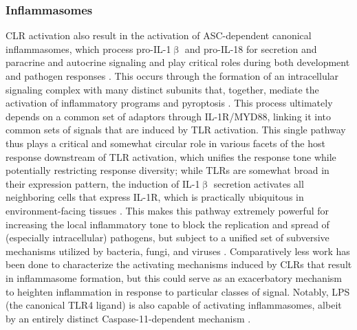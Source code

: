 \subsubsection{Inflammasomes}\label{clr:asc}

CLR activation also result in the activation of ASC\hyp{}dependent canonical inflammasomes, which process pro\hyp{}IL\hyp{}1$\upbeta$ and pro\hyp{}IL\hyp{}18 for secretion and paracrine and autocrine signaling \citep{Gross2011} and play critical roles during both development and pathogen responses \citep{Tyrkalska2019}. This occurs through the formation of an intracellular signaling complex with many distinct subunits that, together, mediate the activation of inflammatory programs and pyroptosis \citep{Pandey2021}. This process ultimately depends on a common set of adaptors through IL\hyp{}1R/MYD88, linking it into common sets of signals that are induced by TLR activation. This single pathway thus plays a critical and somewhat circular role in various facets of the host response downstream of TLR activation, which unifies the response tone while potentially restricting response diversity; while TLRs are somewhat broad in their expression pattern, the induction of IL\hyp{}1$\upbeta$ secretion activates all neighboring cells that express IL\hyp{}1R, which is practically ubiquitous in environment\hyp{}facing tissues \citep{Deyerle1992, Malik2018}. This makes this pathway extremely powerful for increasing the local inflammatory tone to block the replication and spread of (especially intracellular) pathogens, but subject to a unified set of subversive mechanisms utilized by bacteria, fungi, and viruses \citep{Wein2022, MacMicking2012, Poeck2010, Tavares2015}. Comparatively less work has been done to characterize the activating mechanisms induced by CLRs that result in inflammasome formation, but this could serve as an exacerbatory mechanism to heighten inflammation in response to particular classes of signal. Notably, LPS (the canonical TLR4 ligand) is also capable of activating inflammasomes, albeit by an entirely distinct Caspase\hyp{}11\hyp{}dependent mechanism \citep{Hagar2013, Vanaja2016, Pilla2014, Finethy2020}.

